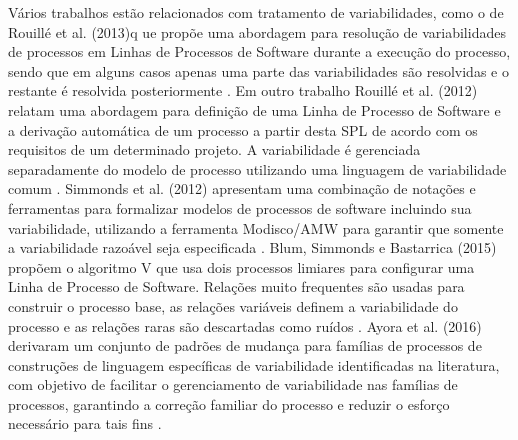 Vários trabalhos estão relacionados com tratamento de variabilidades, como o de Rouillé et al. (2013)q ue propõe uma abordagem para resolução de variabilidades de processos em Linhas de Processos de Software durante a execução do processo, sendo que em alguns casos apenas uma parte das variabilidades são resolvidas e o restante é resolvida posteriormente \cite{14rouille:2013}. Em outro trabalho Rouillé et al. (2012) relatam uma abordagem para definição de uma Linha de Processo de Software e a derivação automática de um processo a partir desta SPL de acordo com os requisitos de um determinado projeto. A variabilidade é gerenciada separadamente do modelo de processo utilizando uma linguagem de variabilidade comum \cite{2rouille:2012}. Simmonds et al. (2012) apresentam uma combinação de notações e ferramentas para formalizar modelos de processos de software incluindo sua variabilidade, utilizando a ferramenta Modisco/AMW para garantir que somente a variabilidade razoável seja especificada \cite{12simmonds:2012}. Blum, Simmonds e Bastarrica (2015) propõem o algoritmo V que usa dois processos limiares para configurar uma Linha de Processo de Software. Relações muito frequentes são usadas para construir o processo base, as relações variáveis definem a variabilidade do processo e as relações raras são descartadas como ruídos \cite{15blum:2015}. Ayora et al. (2016) derivaram um conjunto de padrões de mudança para famílias de processos de construções de linguagem específicas de variabilidade identificadas na literatura, com objetivo de facilitar o gerenciamento de variabilidade nas famílias de processos, garantindo a correção familiar do processo e reduzir o esforço necessário para tais fins \cite{19ayora:2016}.


